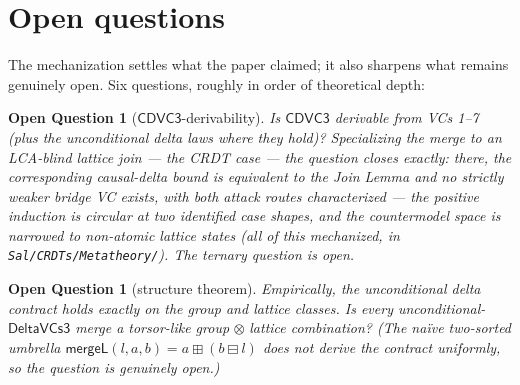 \documentclass[11pt]{article}
\newtheorem{openq}[theorem]{Open Question}
\newcommand{\mergeL}{\mathsf{mergeL}}
\newcommand{\cd}{\mathsf{CDVC3}}
\newcommand{\lean}[1]{\texttt{#1}}
\begin{document}
\section{Open questions}
\label{sec:open}

The mechanization settles what the paper claimed; it also sharpens what
remains genuinely open. Six questions, roughly in order of theoretical
depth:

\begin{openq}[$\cd$-derivability]
\label{oq:cd}
Is $\cd$ derivable from VCs 1--7 (plus the unconditional delta laws where
they hold)? Specializing the merge to an LCA-blind lattice join --- the
CRDT case --- the question closes exactly: there, the corresponding
causal-delta bound is \emph{equivalent} to the Join Lemma and no strictly
weaker bridge VC exists, with both attack routes
characterized --- the positive induction is circular at two identified case
shapes, and the countermodel space is narrowed to non-atomic lattice
states (all of this mechanized, in \lean{Sal/CRDTs/Metatheory/}). The
ternary question is open.
\end{openq}

\begin{openq}[structure theorem]
Empirically, the \emph{unconditional} delta contract holds exactly on the
group and lattice classes. Is every unconditional-$\mathsf{DeltaVCs3}$
merge a torsor-like group$\,\otimes\,$lattice combination? (The na\"ive
two-sorted umbrella $\mergeL(l,a,b) = a \boxplus (b \boxminus l)$ does
\emph{not} derive the contract uniformly, so the question is genuinely
open.)
\end{openq}
\end{document}
